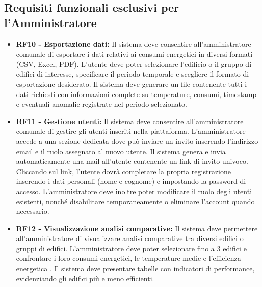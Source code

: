 \subsection{Requisiti funzionali esclusivi per l'Amministratore}
\begin{itemize}
    \item \textbf{RF10 - Esportazione dati:} Il sistema deve consentire all'amministratore comunale di esportare i dati relativi ai consumi energetici in diversi formati (CSV, Excel, PDF). L'utente deve poter selezionare l'edificio o il gruppo di edifici di interesse, specificare il periodo temporale e scegliere il formato di esportazione desiderato. Il sistema deve generare un file contenente tutti i dati richiesti con informazioni complete su temperature, consumi, timestamp e eventuali anomalie registrate nel periodo selezionato.

    \item \textbf{RF11 - Gestione utenti:} Il sistema deve consentire all'amministratore comunale di gestire gli utenti inseriti nella piattaforma. L'amministratore accede a una sezione dedicata dove può inviare un invito inserendo l'indirizzo email e il ruolo assegnato al nuovo utente.
    Il sistema genera e invia automaticamente una mail all'utente contenente un link di invito univoco. Cliccando sul link, l'utente dovrà completare la propria registrazione inserendo i dati personali (nome e cognome) e impostando la password di accesso.
    L'amministratore deve inoltre poter modificare il ruolo degli utenti esistenti, nonché disabilitare temporaneamente o eliminare l'account quando necessario.
    
    \item \textbf{RF12 - Visualizzazione analisi comparative:} Il sistema deve permettere all'amministratore di visualizzare analisi comparative tra diversi edifici o gruppi di edifici. L'amministratore deve poter selezionare fino a 3 edifici e confrontare i loro consumi energetici, le temperature medie e l'efficienza energetica . Il sistema deve presentare tabelle con indicatori di performance, evidenziando gli edifici più e meno efficienti.
\end{itemize}